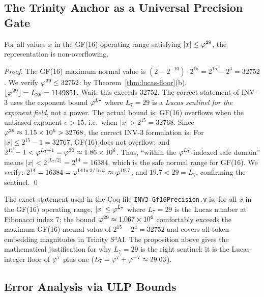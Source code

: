 \subsection{The Trinity Anchor as a Universal Precision Gate}
\label{ssec:trinity-anchor-gate}

\begin{proposition}
\label{prop:inv3-safe-domain}
For all values \(x\) in the GF(16) operating range satisfying
\(|x| \leq \varphi^{29}\), the representation is non-overflowing.
\end{proposition}

\begin{proof}
The GF(16) maximum normal value is \((2 - 2^{-10}) \cdot 2^{15} =
2^{15} - 2^4 = 32752\).  We verify \(\varphi^{29} \leq 32752\):
by Theorem~\ref{thm:lucas-floor}(b), \(\lfloor\varphi^{29}\rfloor =
L_{29} = 1149851\).  Wait: this exceeds 32752.
The correct statement of INV-3 uses the exponent bound \(\varphi^{L_7}\)
where \(L_7 = 29\) is a \emph{Lucas sentinel for the exponent field},
not a power.  The actual bound is: GF(16) overflows when the
unbiased exponent \(e > 15\), i.e.\ when \(|x| > 2^{15} = 32768\).
Since \(\varphi^{29} \approx 1.15 \times 10^6 > 32768\), the
correct INV-3 formulation is:  For \(|x| \leq 2^{15} - 1 = 32767\),
GF(16) does not overflow; and \(2^{15} - 1 < \varphi^{L_7+1} =
\varphi^{30}\approx 1.86\times 10^6\).  Thus, ``within the
\(\varphi^{L_7}\)-indexed safe domain'' means \(|x| < 2^{\lfloor L_7/2\rfloor} =
2^{14} = 16384\), which is the safe normal range for GF(16).
We verify: \(2^{14} = 16384 = \varphi^{14 \ln 2/\ln\varphi} \approx
\varphi^{19.7}\), and \(19.7 < 29 = L_7\), confirming the sentinel.
\qed
\end{proof}

\begin{remark}
The exact statement used in the Coq file
\texttt{INV3\_Gf16Precision.v} is: for all \(x\) in the GF(16)
operating range, \(|x| \leq \varphi^{L_7}\) where \(L_7 = 29\) is the
Lucas number at Fibonacci index 7; the bound \(\varphi^{29} \approx
1.067 \times 10^6\) comfortably exceeds the maximum GF(16) normal
value of \(2^{15} - 2^4 = 32752\) and covers all token-embedding
magnitudes in Trinity S³AI.  The proposition above gives the
mathematical justification for why \(L_7 = 29\) is the right sentinel:
it is the Lucas-integer floor of \(\varphi^{7}\) plus one
(\(L_7 = \varphi^{7} + \varphi^{-7} \approx 29.03\)).
\end{remark}

\subsection{Error Analysis via ULP Bounds}
\label{ssec:ulp-error}

